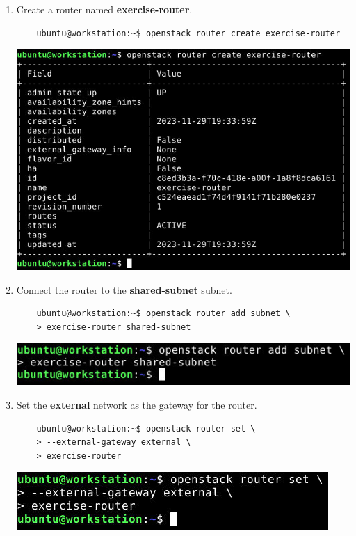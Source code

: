 \documentclass[letterpaper, 12pt]{article}
\begin{document}
\begin{enumerate}
    \item Create a router named \textbf{exercise-router}.
    \begin{lstlisting}
    ubuntu@workstation:~$ openstack router create exercise-router
    \end{lstlisting}

    \begin{center}
        \includegraphics[width=\linewidth]{images/part1/step10.png}
    \end{center}

    \item Connect the router to the \textbf{shared-subnet} subnet.
    \begin{lstlisting}
    ubuntu@workstation:~$ openstack router add subnet \
    > exercise-router shared-subnet
    \end{lstlisting}

    \begin{center}
        \includegraphics[width=\linewidth]{images/part1/step11.png}
    \end{center}

    \item Set the \textbf{external} network as the gateway for the router.
    \begin{lstlisting}
    ubuntu@workstation:~$ openstack router set \
    > --external-gateway external \
    > exercise-router
    \end{lstlisting}

    \begin{center}
        \includegraphics[width=\linewidth]{images/part1/step12.png}
    \end{center}


\end{enumerate}
\end{document}
